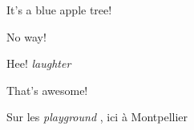 \documentclass[11pt,a4paper]{article}
\begin{document}
It’s a blue apple tree!

No way!

Hee!   \textit{laughter}

That’s awesome!

Sur les  \textit{playground} , ici à Montpellier
\end{document}
